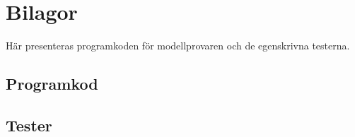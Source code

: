 \section{Bilagor}
Här presenteras programkoden för modellprovaren och de egenskrivna testerna.
\subsection{Programkod}
\label{sub:programkod}

\clearpage
\subsection{Tester}
\label{sub:tester}

